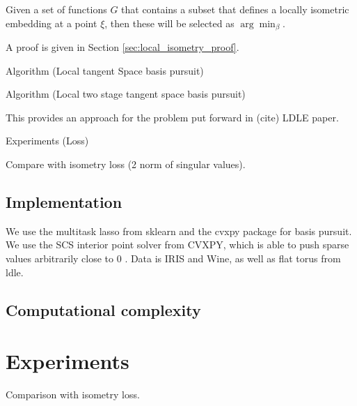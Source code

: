  
\begin{proposition}
\label{prop:local_isometry}
Given a set of functions $G$ that contains a subset that defines a locally isometric embedding at a point $\xi$, then these will be selected as $\arg \min_\beta$.
\end{proposition}
A proof is given in Section \ref{sec:local_isometry_proof}.


Algorithm (Local tangent Space basis pursuit)

Algorithm (Local two stage tangent space basis pursuit)

This provides an approach for the problem put forward in (cite) LDLE paper.

Experiments (Loss)

Compare with isometry loss (2 norm of singular values).

\subsection{Implementation}

We use the multitask lasso from sklearn and the cvxpy package for basis pursuit.  We use the SCS interior point solver from CVXPY, which is able to push sparse values arbitrarily close to 0 \cite{cvxpy_sparse_solution}. Data is IRIS and Wine, as well as flat torus from ldle.
\subsection{Computational complexity}
\section{Experiments}

Comparison with isometry loss.